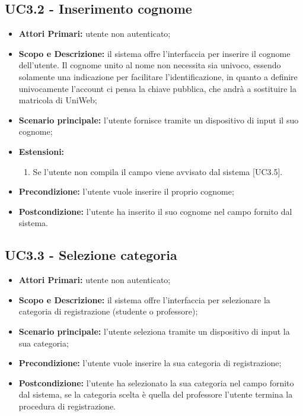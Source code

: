\documentclass[AnalisiDeiRequisiti.tex]{subfiles}
\begin{document}
\subsection{UC3.2 - Inserimento cognome}
\begin{itemize}
	\item \textbf{Attori Primari:} utente non autenticato;
	\item \textbf{Scopo e Descrizione:} il sistema offre l'interfaccia per inserire il cognome dell'utente. Il cognome unito al nome non necessita sia univoco, essendo solamente una indicazione per facilitare l'identificazione, in quanto a definire univocamente l'account ci pensa la chiave pubblica, che andrà a sostituire la matricola di UniWeb;
	\item \textbf{Scenario principale:} l'utente fornisce tramite un dispositivo di input il suo cognome;
	\item \textbf{Estensioni:}
		\begin{enumerate}
				\item Se l'utente non compila il campo viene avvisato dal sistema [UC3.5].
		\end{enumerate}		
	\item \textbf{Precondizione:} l'utente vuole inserire il proprio cognome;
	\item \textbf{Postcondizione:} l'utente ha inserito il suo cognome nel campo fornito dal sistema.
\end{itemize}
\subsection{UC3.3 - Selezione categoria}
\begin{itemize}
	\item \textbf{Attori Primari:} utente non autenticato;
	\item \textbf{Scopo e Descrizione:} il sistema offre l'interfaccia per selezionare la categoria di registrazione (studente o professore);
	\item \textbf{Scenario principale:} l'utente seleziona tramite un dispositivo di input la sua categoria;
	\item \textbf{Precondizione:} l'utente vuole inserire la sua categoria di registrazione;
	\item \textbf{Postcondizione:} l'utente ha selezionato la sua categoria nel campo fornito dal sistema, se la categoria scelta è quella del professore l'utente termina la procedura di registrazione.
\end{itemize}
\end{document}
